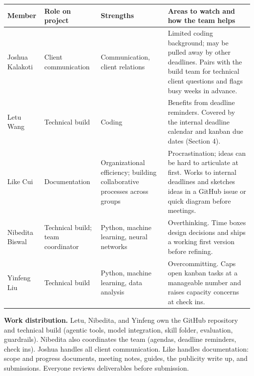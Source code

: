 \documentclass[11pt]{article}
\begin{document}
{\small
\begin{tabularx}{\textwidth}{@{}>{\raggedright\arraybackslash}p{3.7cm}>{\raggedright\arraybackslash}p{3.1cm}LL@{}}
\toprule
\textbf{Member} & \textbf{Role on project} & \textbf{Strengths} & \textbf{Areas to watch and how the team helps} \\
\midrule
Joshua Kalakoti & Client communication & Communication, client relations & Limited coding background; may be pulled away by other deadlines. Pairs with the build team for technical client questions and flags busy weeks in advance. \\
Letu Wang & Technical build & Coding & Benefits from deadline reminders. Covered by the internal deadline calendar and kanban due dates (Section 4). \\
Like Cui & Documentation & Organizational efficiency; building collaborative processes across groups & Procrastination; ideas can be hard to articulate at first. Works to internal deadlines and sketches ideas in a GitHub issue or quick diagram before meetings. \\
Nibedita Biswal & Technical build; team coordinator & Python, machine learning, neural networks & Overthinking. Time boxes design decisions and ships a working first version before refining. \\
Yinfeng Liu & Technical build & Python, machine learning, data analysis & Overcommitting. Caps open kanban tasks at a manageable number and raises capacity concerns at check ins. \\
\bottomrule
\end{tabularx}}

\textbf{Work distribution.} Letu, Nibedita, and Yinfeng own the GitHub repository and technical build (agentic tools, model integration, skill folder, evaluation, guardrails). Nibedita also coordinates the team (agendas, deadline reminders, check ins). Joshua handles all client communication. Like handles documentation: scope and progress documents, meeting notes, guides, the publicity write up, and submissions. Everyone reviews deliverables before submission.
\end{document}
